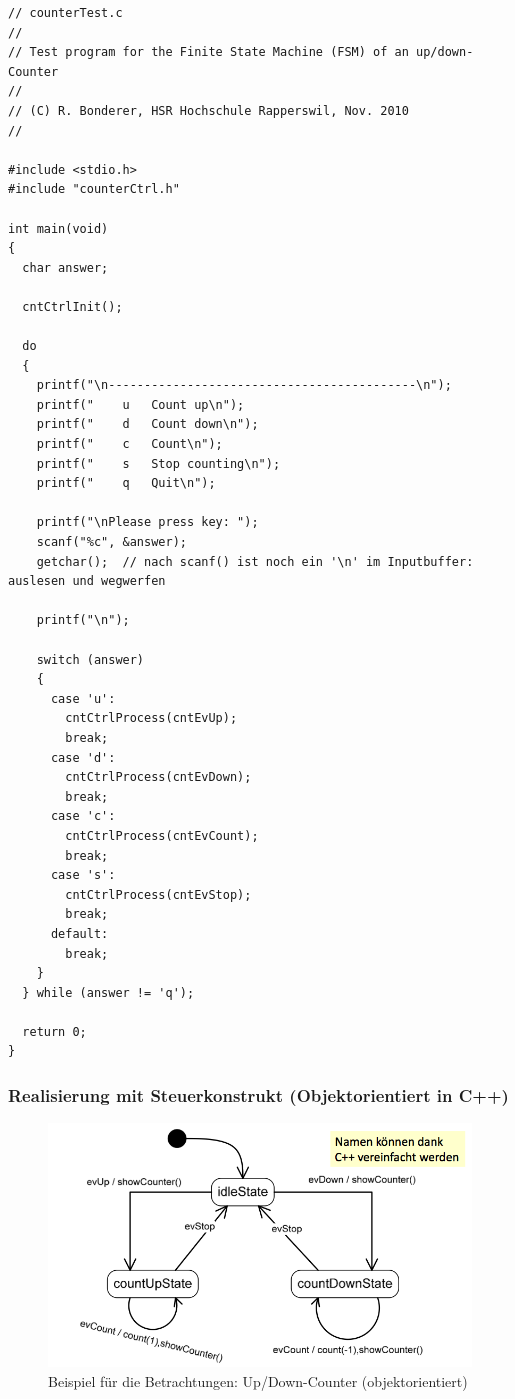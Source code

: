 \begin{lstlisting}
// counterTest.c
//
// Test program for the Finite State Machine (FSM) of an up/down-Counter
//
// (C) R. Bonderer, HSR Hochschule Rapperswil, Nov. 2010
//

#include <stdio.h>
#include "counterCtrl.h"

int main(void)
{
  char answer;
  
  cntCtrlInit();
  
  do
  {
    printf("\n-------------------------------------------\n");
    printf("    u   Count up\n");
    printf("    d   Count down\n");
    printf("    c   Count\n");
    printf("    s   Stop counting\n");
    printf("    q   Quit\n");

    printf("\nPlease press key: ");
    scanf("%c", &answer);
    getchar();  // nach scanf() ist noch ein '\n' im Inputbuffer: auslesen und wegwerfen

    printf("\n");
    
    switch (answer)
    {
      case 'u':
        cntCtrlProcess(cntEvUp);
        break;
      case 'd':
        cntCtrlProcess(cntEvDown);
        break;
      case 'c':
        cntCtrlProcess(cntEvCount);
        break;
      case 's':
        cntCtrlProcess(cntEvStop);
        break;
      default:
        break;
    }
  } while (answer != 'q');
  
  return 0;
}
\end{lstlisting}

\subsubsection{Realisierung mit Steuerkonstrukt (Objektorientiert in
C++)}

\begin{figure}[h]
  \centering
  {\includegraphics[scale = 0.4]{images/FSM/Up_down_counter_obj}  
  \caption{Beispiel für die Betrachtungen: Up/Down-Counter (objektorientiert)}
  \label{fig:up_down_counter_obj}}
\end{figure}

